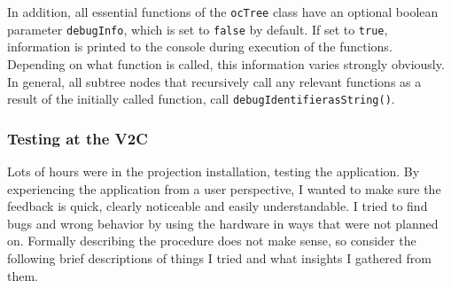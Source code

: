 In addition, all essential functions of the \texttt{ocTree} class have an optional boolean parameter \texttt{debugInfo}, which is set to \texttt{false} by default. If set to \texttt{true}, information is printed to the console during execution of the functions. Depending on what function is called, this information varies strongly obviously. In general, all subtree nodes that recursively call any relevant functions as a result of the initially called function, call \texttt{debugIdentifierasString()}.

		\subsubsection{Testing at the V2C}
		\label{sec:testing_at_the_v2c}

Lots of hours were in the projection installation, testing the application. By experiencing the application from a user perspective, I wanted to make sure the feedback is quick, clearly noticeable and easily understandable. I tried to find bugs and wrong behavior by using the hardware in ways that were not planned on. Formally describing the procedure does not make sense, so consider the following brief descriptions of things I tried and what insights I gathered from them.

